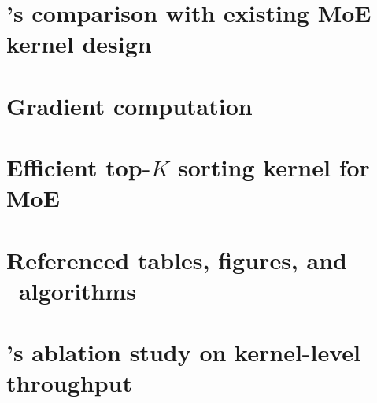 \appendix


\clearpage


\clearpage

% 

\section{\Algname's comparison with existing MoE kernel design} \label{sec:appendix:kernel_comparison}




\section{Gradient computation} \label{sec:appendix:dH_proof}



\section{Efficient top-$K$ sorting kernel for MoE} \label{sec:appendix:top-k}


\section{Referenced tables, figures, and \Algname~algorithms} \label{sec:appendix:more_kernel}
 




\clearpage
\section{\Algname's ablation study on kernel-level throughput} \label{sec:appendix:kernel_ablation}




%  


